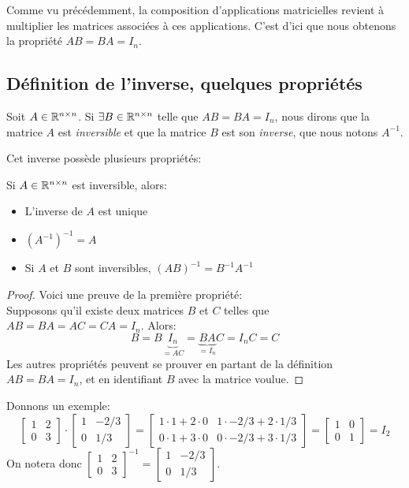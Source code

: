 \noindent Comme vu précédemment, la composition d'applications matricielles revient à multiplier les matrices associées à ces applications. C'est d'ici que nous obtenons la propriété $AB=BA = I_n$.

\subsection{Définition de l'inverse, quelques propriétés}
\begin{boxdef}
Soit $A \in \mathbb{R}^{n \times n}$. Si $\exists B \in \mathbb{R}^{n \times n}$ telle que $AB=BA=I_n$, nous dirons que la matrice $A$ est \textit{inversible} et que la matrice $B$ est son \textit{inverse}, que nous notons $A^{-1}$.
\end{boxdef}

\noindent Cet inverse possède plusieurs propriétés:
\begin{boxprop}
Si $A \in \mathbb{R}^{n \times n}$ est inversible, alors:
\begin{itemize}
    \item L'inverse de $A$ est unique
    \item $(A^{-1})^{-1} = A$
    \item Si $A$ et $B$ sont inversibles, $(AB)^{-1} = B^{-1} A^{-1}$
\end{itemize}
\end{boxprop}

\begin{proof}
Voici une preuve de la première propriété:\\
Supposons qu'il existe deux matrices $B$ et $C$ telles que $AB=BA=AC=CA=I_n$. Alors:
$$B = B\underbrace{I_n}_{=AC} = \underbrace{BA}_{=I_n}C = I_n C = C$$
Les autres propriétés peuvent se prouver en partant de la définition $AB=BA=I_n$, et en identifiant $B$ avec la matrice voulue.

\end{proof}

\noindent Donnons un exemple:
$$\begin{bmatrix} 1 & 2 \\ 0 & 3 \end{bmatrix} \cdot \begin{bmatrix} 1 & -2/3 \\ 0 & 1/3 \end{bmatrix} = \begin{bmatrix} 1\cdot 1 + 2\cdot 0 & 1\cdot -2/3 + 2\cdot 1/3 \\ 0\cdot 1 + 3\cdot 0 & 0\cdot -2/3 + 3\cdot 1/3 \end{bmatrix} = \begin{bmatrix} 1 & 0 \\ 0 & 1 \end{bmatrix} = I_2$$
On notera donc $\begin{bmatrix} 1 & 2 \\ 0 & 3 \end{bmatrix}^{-1} = \begin{bmatrix} 1 & -2/3 \\ 0 & 1/3 \end{bmatrix}$. \\

